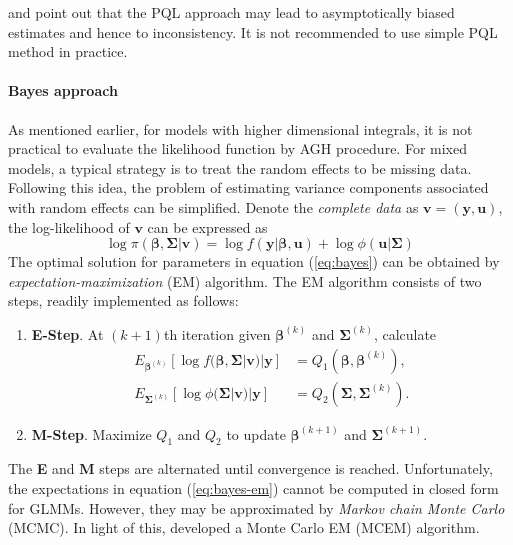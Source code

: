 \citet{breslow1995bias}  and \citet{pinheiro2006efficient} point out that the PQL approach may lead 
to asymptotically biased estimates and hence to inconsistency. It is not recommended to use simple 
PQL method in practice. 


\paragraph{Bayes approach}
As mentioned earlier, for models with higher dimensional integrals, it is not practical to
evaluate the likelihood function by AGH procedure. For mixed models, a typical strategy is to treat
the random effects to be missing data. Following this idea, the problem of estimating variance
components associated with random effects can be simplified. Denote the \textit{complete data} as
$\bm v = (\bm y, \bm u)$, the log-likelihood of $\bm v$ can be expressed as 
\begin{equation}\label{eq:bayes}
	\log \pi(\bm \beta , \bm \Sigma|\bm v) = \log f(\bm y|\bm \beta, \bm u) + \log \phi(\bm u|\bm
	\Sigma)
\end{equation}  
The optimal solution for parameters in equation (\ref{eq:bayes}) can be obtained by
\textit{expectation-maximization} (EM) algorithm. The EM algorithm consists of two steps, readily 
implemented as follows:
\begin{enumerate}
	\item \textbf{E-Step}. At $(k+1)$th iteration given $\bm \beta^{(k)}$ and $\bm\Sigma^{(k)}$,  
	calculate 
	\begin{equation}\label{eq:bayes-em}
		\begin{aligned}
			E_{\bm \beta^{(k)}}[\log f(\bm \beta , \bm \Sigma|\bm v)|\bm y]&= Q_1(\bm \beta, \bm 
			\beta^{(k)}),\\
			E_{\bm \Sigma^{(k)}}[\log \phi(\bm \Sigma|\bm v)|\bm y]&= Q_2(\bm \Sigma, \bm 
			\Sigma^{(k)}).
		\end{aligned}
	\end{equation}
	\item \textbf{M-Step}. Maximize $Q_1$ and $Q_2$ to update  $\bm \beta^{(k+1)}$ and
	$\bm\Sigma^{(k+1)}$.
\end{enumerate}
The \textbf{E} and \textbf{M} steps are alternated until convergence is reached. Unfortunately, the
expectations in equation (\ref{eq:bayes-em}) cannot be computed in closed form for GLMMs. However,
they may be approximated by \textit{Markov chain Monte Carlo} (MCMC). In light of this,
\citet{mcculloch1997maximum} developed a Monte Carlo EM (MCEM) algorithm. 

